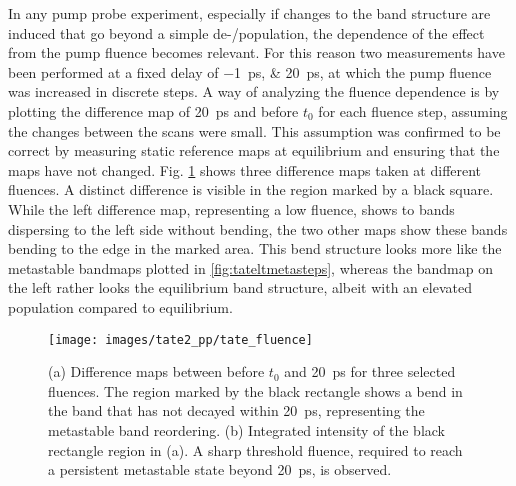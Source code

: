 In any pump probe experiment, especially if changes to the band structure are induced that go beyond a simple de-/population, the dependence of the effect from the pump fluence becomes relevant.
For this reason two measurements have been performed at a fixed delay of \qtylist{-1; 20}{\pico\second}, at which the pump fluence was increased in discrete steps.
A way of analyzing the fluence dependence is by plotting the difference map of \qty{20}{\pico\second} and before $t_0$ for each fluence step, assuming the changes between the scans were small.
This assumption was confirmed to be correct by measuring static reference maps at equilibrium and ensuring that the maps have not changed.
Fig. \ref{fig:tate_fluence} shows three difference maps taken at different fluences.
A distinct difference is visible in the region marked by a black square.
While the left difference map, representing a low fluence, shows to bands dispersing to the left side without bending, the two other maps show these bands bending to the edge in the marked area.
This bend structure looks more like the metastable bandmaps plotted in \ref{fig:tateltmetasteps}, whereas the bandmap on the left rather looks the equilibrium band structure, albeit with an elevated population compared to equilibrium.


\begin{figure}[t!]
	\centering
	\texttt{[image: images/tate2\_pp/tate\_fluence]}
	\caption{(a) Difference maps between before $t_0$ and \qty{20}{\pico\second} for three selected fluences. The region marked by the black rectangle shows a bend in the band that has not decayed within \qty{20}{\pico\second}, representing the metastable band reordering. (b) Integrated intensity of the black rectangle region in (a). A sharp threshold fluence, required to reach a persistent metastable state beyond \qty{20}{\pico\second}, is observed.}
	\label{fig:tate_fluence}
\end{figure}


